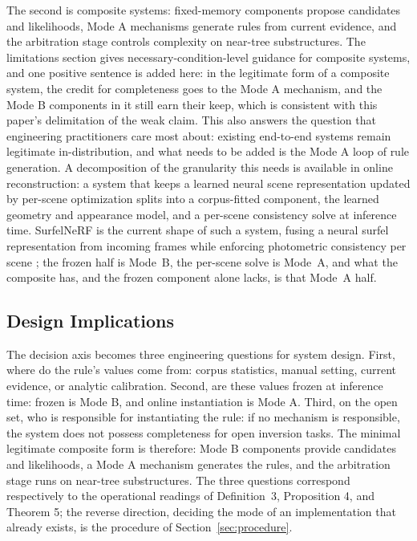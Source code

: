 The second is composite systems: fixed-memory components propose candidates and likelihoods, Mode A mechanisms generate rules from current evidence, and the arbitration stage controls complexity on near-tree substructures. The limitations section gives necessary-condition-level guidance for composite systems, and one positive sentence is added here: in the legitimate form of a composite system, the credit for completeness goes to the Mode A mechanism, and the Mode B components in it still earn their keep, which is consistent with this paper's delimitation of the weak claim. This also answers the question that engineering practitioners care most about: existing end-to-end systems remain legitimate in-distribution, and what needs to be added is the Mode A loop of rule generation. A decomposition of the granularity this needs is available in online reconstruction: a system that keeps a learned neural scene representation updated by per-scene optimization splits into a corpus-fitted component, the learned geometry and appearance model, and a per-scene consistency solve at inference time. SurfelNeRF is the current shape of such a system, fusing a neural surfel representation from incoming frames while enforcing photometric consistency per scene \citep{gao2023surfelnerf}; the frozen half is Mode~B, the per-scene solve is Mode~A, and what the composite has, and the frozen component alone lacks, is that Mode~A half.

\subsection{Design Implications}

The decision axis becomes three engineering questions for system design. First, where do the rule's values come from: corpus statistics, manual setting, current evidence, or analytic calibration. Second, are these values frozen at inference time: frozen is Mode B, and online instantiation is Mode A. Third, on the open set, who is responsible for instantiating the rule: if no mechanism is responsible, the system does not possess completeness for open inversion tasks. The minimal legitimate composite form is therefore: Mode B components provide candidates and likelihoods, a Mode A mechanism generates the rules, and the arbitration stage runs on near-tree substructures. The three questions correspond respectively to the operational readings of Definition~3, Proposition 4, and Theorem 5; the reverse direction, deciding the mode of an implementation that already exists, is the procedure of Section~\ref{sec:procedure}.

